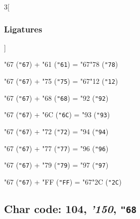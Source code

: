 \documentclass{article}
\newlength{\maxcharwidth}
\begin{document}
\begin{multicols}{3}[\subsubsection{Ligatures}]

{\testfont\char"67\noboundary} ({\tt"67}) + {\testfont\char"61\noboundary} ({\tt"61}) = {\testfont\char"67\noboundary}{\testfont\char"78\noboundary} ({\tt"78}) 

{\testfont\char"67\noboundary} ({\tt"67}) + {\testfont\char"75\noboundary} ({\tt"75}) = {\testfont\char"67\noboundary}{\testfont\char"12\noboundary} ({\tt"12}) 

{\testfont\char"67\noboundary} ({\tt"67}) + {\testfont\char"68\noboundary} ({\tt"68}) = {\testfont\char"92\noboundary} ({\tt"92}) 

{\testfont\char"67\noboundary} ({\tt"67}) + {\testfont\char"6C\noboundary} ({\tt"6C}) = {\testfont\char"93\noboundary} ({\tt"93}) 

{\testfont\char"67\noboundary} ({\tt"67}) + {\testfont\char"72\noboundary} ({\tt"72}) = {\testfont\char"94\noboundary} ({\tt"94}) 

{\testfont\char"67\noboundary} ({\tt"67}) + {\testfont\char"77\noboundary} ({\tt"77}) = {\testfont\char"96\noboundary} ({\tt"96}) 

{\testfont\char"67\noboundary} ({\tt"67}) + {\testfont\char"79\noboundary} ({\tt"79}) = {\testfont\char"97\noboundary} ({\tt"97}) 

{\testfont\char"67\noboundary} ({\tt"67}) + {\testfont\char"FF\noboundary} ({\tt"FF}) = {\testfont\char"67\noboundary}{\testfont\char"2C\noboundary} ({\tt"2C}) 

\end{multicols}

\subsection{Char code: 104, {\it'150}, {\tt"68}}
\label{char_104}

\end{document}
